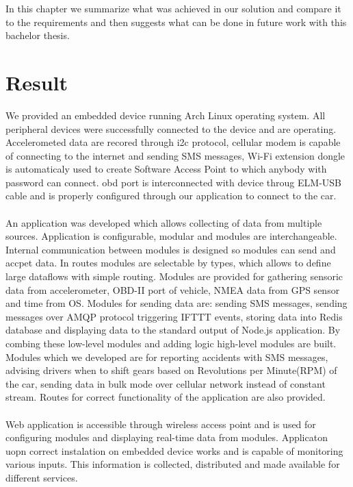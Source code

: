 In this chapter we summarize what was achieved in our solution and compare it to the requirements and then suggests what can be done in future work with this bachelor thesis.
\section{Result} %
\label{sec:result}
We provided an embedded device running Arch Linux operating system. All peripheral devices were successfully connected to the device and are operating. Accelerometed data are recored through \gls{i2c} protocol, cellular modem is capable of connecting to the internet and sending SMS messages, Wi-Fi extension dongle is automaticaly used to create Software Access Point to which anybody with password can connect. \gls{obd} port is interconnected with device throug ELM-USB cable and is properly configured through our application to connect to the car.\\\\
An application was developed which allows collecting of data from multiple sources. Application is configurable, modular and modules are interchangeable. Internal communication between modules is designed so modules can send and accpet data. In routes modules are selectable by types, which allows to define large dataflows with simple routing. Modules are provided for gathering sensoric data from accelerometer, OBD-II port of vehicle, NMEA data from GPS sensor and time from OS. Modules for sending data are: sending SMS messages, sending messages over AMQP protocol triggering IFTTT events, storing data into Redis database and displaying data to the standard output of Node.js application. By combing these low-level modules and adding logic high-level modules are built. Modules which we developed are for reporting accidents with SMS messages, advising drivers when to shift gears based on Revolutions per Minute(RPM) of the car, sending data in bulk mode over cellular network instead of constant stream. Routes for correct functionality of the application are also provided.\\\\
Web application is accessible through wireless access point and is used for configuring modules and displaying real-time data from modules. Applicaton uopn correct instalation on embedded device works and is capable of monitoring various inputs. This information is collected, distributed and made available for different services.\\\\
